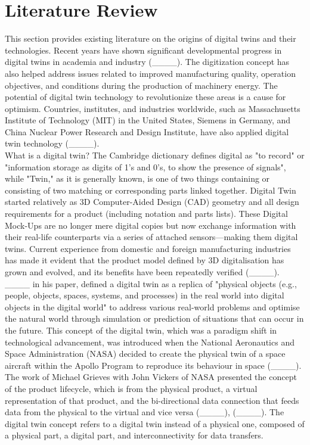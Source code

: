 \section{Literature Review}
This section provides existing literature on the origins of digital twins and their technologies.
Recent years have shown significant developmental progress in digital twins in academia and industry (____). The digitization concept has also helped address issues related to improved manufacturing quality, operation objectives, and conditions during the production of machinery energy. The potential of digital twin technology to revolutionize these areas is a cause for optimism. Countries, institutes, and industries worldwide, such as Massachusetts Institute of Technology (MIT) in the United States, Siemens in Germany, and China Nuclear Power Research and Design Institute, have also applied digital twin technology (____).\\
What is a digital twin? The Cambridge dictionary defines digital as "to record" or "information storage as digits of 1's and 0's, to show the presence of signals", while "Twin," as it is generally known, is one of two things containing or consisting of two matching or corresponding parts linked together. 
Digital Twin started relatively as 3D Computer-Aided Design (CAD) geometry and all design requirements for a product (including notation and parts lists). These Digital Mock-Ups are no longer mere digital copies but now exchange information with their real-life counterparts via a series of attached sensors—making them digital twins. Current experience from domestic and foreign manufacturing industries has made it evident that the product model defined by 3D digitalisation has grown and evolved, and its benefits have been repeatedly verified (____).
____ in his paper, defined a digital twin as a replica of "physical objects (e.g., people, objects, spaces, systems, and processes) in the real world into digital objects in the digital world" to address various real-world problems and optimise the natural world through simulation or prediction of situations that can occur in the future. This concept of the digital twin, which was a paradigm shift in technological advancement, was introduced when the National Aeronautics and Space Administration (NASA) decided to create the physical twin of a space aircraft within the Apollo Program to reproduce its behaviour in space (____). The work of Michael Grieves with John Vickers of NASA presented the concept of the product lifecycle, which is from the physical product, a virtual representation of that product, and the bi-directional data connection that feeds data from the physical to the virtual and vice versa (____), (____). The digital twin concept refers to a digital twin instead of a physical one, composed of a physical part, a digital part, and interconnectivity for data transfers. 
